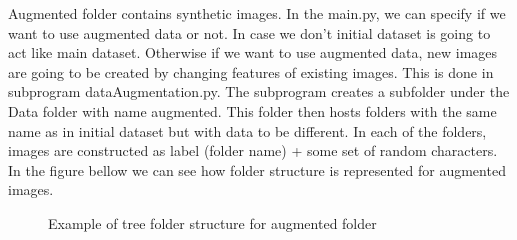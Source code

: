 Augmented folder contains synthetic images. In the main.py, we can specify if we want to use augmented data or not. In case we don't initial dataset is going to act like main dataset. Otherwise if we want to use augmented data, new images are going to be created by changing features of existing images. This is done in subprogram dataAugmentation.py. The subprogram creates a subfolder under the Data folder with name augmented. This folder then hosts folders with the same name as in initial dataset but with data to be different. In each of the folders, images are constructed as label (folder name) + some set of random characters. In the figure bellow we can see how folder structure is represented for augmented images.
\newpage
\begin{figure}[!ht]
    \caption{Example of tree folder structure for augmented folder}
\end{figure}


